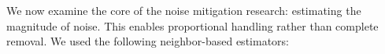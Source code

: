 
We now examine the core of the noise mitigation research: estimating the magnitude of noise. This enables proportional handling rather than complete removal. We used the following neighbor-based estimators:

